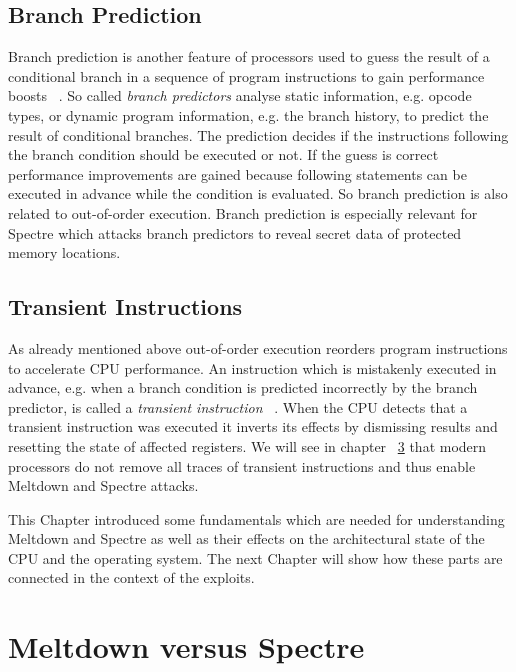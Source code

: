 \documentclass[a4paper,oneside,openright] {scrreprt}
\begin{document}
\section{Branch Prediction}
\label{ch:intro:branch_prediction}

Branch prediction is another feature of processors used to guess the result of a conditional branch in a sequence 
of program instructions to gain performance boosts ~\cite{smith1995microarchitecture}.
So called \textit{branch predictors} analyse static information, e.g. opcode types, or dynamic program information, 
e.g. the branch history, to predict the result of conditional branches.
The prediction decides if the instructions following the branch condition should be executed or not.
If the guess is correct performance improvements are gained because following statements can be executed in advance 
while the condition is evaluated. So branch prediction is also related to out-of-order execution.
Branch prediction is especially relevant for Spectre which attacks branch predictors to reveal secret data of 
protected memory locations.

\section{Transient Instructions}
\label{ch:intro:branch_prediction}

As already mentioned above out-of-order execution reorders program instructions to accelerate CPU performance.
An instruction which is mistakenly executed in advance, e.g. when a branch condition is predicted incorrectly by the branch predictor, 
is called a \textit{transient instruction} ~\cite{lipp2018meltdown, kocher2018spectre}.
When the CPU detects that a transient instruction was executed it inverts its effects by dismissing results 
and resetting the state of affected registers.
We will see in chapter ~\ref{ch:meltdownVersusSpectre} that modern processors do not remove all traces of transient instructions 
and thus enable Meltdown and Spectre attacks.

This Chapter introduced some fundamentals which are needed for understanding Meltdown and Spectre as well as their 
effects on the architectural state of the CPU and the operating system. The next Chapter will show how these parts
are connected in the context of the exploits.

\chapter{Meltdown versus Spectre}
\label{ch:meltdownVersusSpectre}
\end{document}

